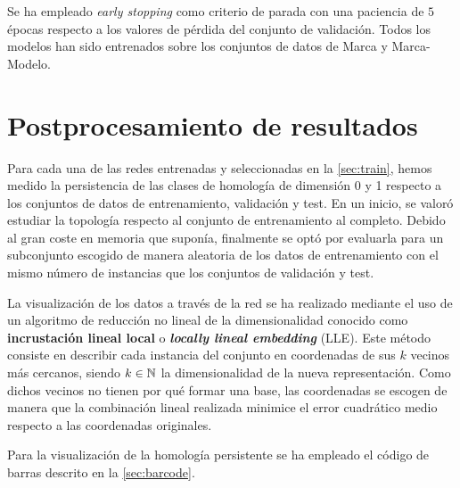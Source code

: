 Se ha empleado \textit{early stopping} como criterio de parada con una paciencia de $5$ épocas respecto a los valores de pérdida del conjunto de validación. Todos los modelos han sido entrenados sobre los conjuntos de datos de Marca y Marca-Modelo.

\section{Postprocesamiento de resultados}

Para cada una de las redes entrenadas y seleccionadas en la \autoref{sec:train}, hemos medido la persistencia de las clases de homología de dimensión 0 y 1 respecto a los conjuntos de datos de entrenamiento, validación y test. En un inicio, se valoró estudiar la topología respecto al conjunto de entrenamiento al completo. Debido al gran coste en memoria que suponía, finalmente se optó por evaluarla para un subconjunto escogido de manera aleatoria de los datos de entrenamiento con el mismo número de instancias que los conjuntos de validación y test.

La visualización de los datos a través de la red se ha realizado mediante el uso de un algoritmo de reducción no lineal de la dimensionalidad conocido como \textbf{incrustación lineal local} o \textbf{\textit{locally lineal embedding}} (LLE). Este método consiste en describir cada instancia del conjunto en coordenadas de sus $k$ vecinos más cercanos, siendo $k \in \mathbb{N}$ la dimensionalidad de la nueva representación. Como dichos vecinos no tienen por qué formar una base, las coordenadas se escogen de manera que la combinación lineal realizada minimice el error cuadrático medio respecto a las coordenadas originales.

Para la visualización de la homología persistente se ha empleado el código de barras descrito en la \autoref{sec:barcode}.

\endinput

